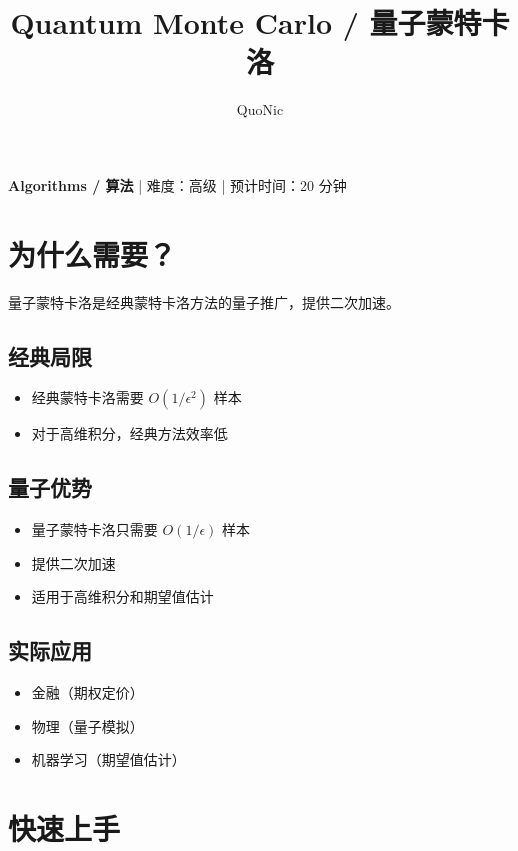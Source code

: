 \documentclass[12pt,a4paper]{article}
\title{Quantum Monte Carlo / 量子蒙特卡洛}
\author{QuoNic}
\date{}
\begin{document}
\maketitle

\begin{center}
\textbf{Algorithms / 算法} | 难度：高级 | 预计时间：20 分钟
\end{center}

\tableofcontents
\newpage

\section{为什么需要？}

量子蒙特卡洛是经典蒙特卡洛方法的量子推广，提供二次加速。

\subsection{经典局限}
\begin{itemize}
  \item 经典蒙特卡洛需要 $O(1/\epsilon^2)$ 样本
  \item 对于高维积分，经典方法效率低
\end{itemize}

\subsection{量子优势}
\begin{itemize}
  \item 量子蒙特卡洛只需要 $O(1/\epsilon)$ 样本
  \item 提供二次加速
  \item 适用于高维积分和期望值估计
\end{itemize}

\subsection{实际应用}
\begin{itemize}
  \item 金融（期权定价）
  \item 物理（量子模拟）
  \item 机器学习（期望值估计）
\end{itemize}

\section{快速上手}
\end{document}
